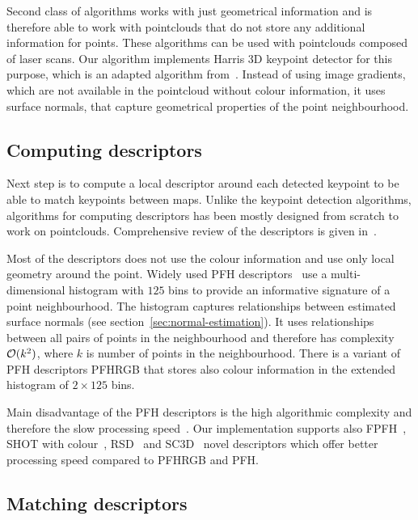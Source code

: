 Second class of algorithms works with just geometrical information and is therefore able to work with pointclouds that do not store any additional information for points. These algorithms can be used with pointclouds composed of laser scans. Our algorithm implements Harris 3D keypoint detector for this purpose, which is an adapted algorithm from~\citet{harris1988combined}. Instead of using image gradients, which are not available in the pointcloud without colour information, it uses surface normals, that capture geometrical properties of the point neighbourhood.

\subsection{Computing descriptors}

Next step is to compute a local descriptor around each detected keypoint to be able to match keypoints between maps. Unlike the keypoint detection algorithms, algorithms for computing descriptors has been mostly designed from scratch to work on pointclouds. Comprehensive review of the descriptors is given in~\citet{YasirThesis}.

Most of the descriptors does not use the colour information and use only local geometry around the point. Widely used \gls{PFH} descriptors~\citet{rusu2008pfh} use a multi-dimensional histogram with $125$ bins to provide an informative signature of a point neighbourhood. The histogram captures relationships between estimated surface normals (see section~\ref{sec:normal-estimation}). It uses relationships between all pairs of points in the neighbourhood and therefore has complexity $\operatorname{\mathcal{O}}(k^2)$, where $k$ is number of points in the neighbourhood. There is a variant of \gls{PFH} descriptors \gls{PFHRGB} that stores also colour information in the extended histogram of $2 \times 125$ bins.

Main disadvantage of the \gls{PFH} descriptors is the high algorithmic complexity and therefore the slow processing speed~\citet{rusu2009fpfh}. Our implementation supports also \gls{FPFH}~\citet{rusu2009fpfh}, \gls{SHOT} with colour~\citet{tombari2011shot}, \gls{RSD}~\citet{marton2010rsd} and \gls{SC3D}~\citet{frome2004sc3d} novel descriptors which offer better processing speed compared to \gls{PFHRGB} and \gls{PFH}.

\subsection{Matching descriptors}
\label{sec:matching}

